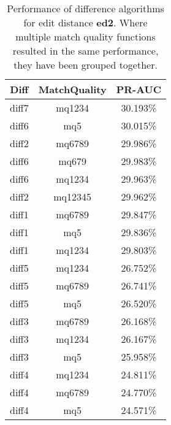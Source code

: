 \begin{table}[tbph]
\begin{center}
\begin{tabular}{|c|c||c|}
\hline
Diff & MatchQuality & PR-AUC  \\
\hline
\hline
diff7 & mq1234 & 30.193\% \\
diff6 & mq5 & 30.015\% \\
diff2 & mq6789 & 29.986\% \\
diff6 & mq679 & 29.983\% \\
diff6 & mq1234 & 29.963\% \\
diff2 & mq12345 & 29.962\% \\
diff1 & mq6789 & 29.847\% \\
diff1 & mq5 & 29.836\% \\
diff1 & mq1234 & 29.803\% \\
diff5 & mq1234 & 26.752\% \\
diff5 & mq6789 & 26.741\% \\
diff5 & mq5 & 26.520\% \\
diff3 & mq6789 & 26.168\% \\
diff3 & mq1234 & 26.167\% \\
diff3 & mq5 & 25.958\% \\
diff4 & mq1234 & 24.811\% \\
diff4 & mq6789 & 24.770\% \\
diff4 & mq5 & 24.571\% \\
\hline
\end{tabular}
\end{center}
\caption{Performance of difference algorithms for
  edit distance \textbf{ed2}.  Where multiple match
  quality functions resulted in the same performance, they
  have been grouped together.}
\label{tab:editlongbyed2}
\end{table}

